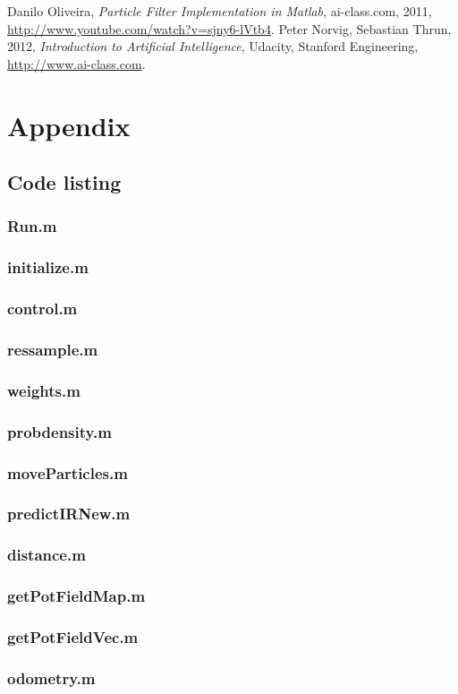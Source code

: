 \documentclass[paper=a4, fontsize=12pt]{scrartcl}	%
\numberwithin{equation}{section}		%
\numberwithin{figure}{section}			%
\numberwithin{table}{section}				%
\begin{document}
\begin{thebibliography}{9}
  Danilo Oliveira,
  \emph{Particle Filter Implementation in Matlab},
  ai-class.com,
  2011,
  \url{http://www.youtube.com/watch?v=sjny6-lVtb4}.
  Peter Norvig, Sebastian Thrun,
  2012,
  \emph{Introduction to Artificial Intelligence},
  Udacity, Stanford Engineering,
  \url{http://www.ai-class.com}.
\end{thebibliography}
\section{Appendix}
\subsection{Code listing}
\subsubsection{Run.m}

\subsubsection{initialize.m}

\subsubsection{control.m}

\subsubsection{ressample.m}

\subsubsection{weights.m}

\subsubsection{probdensity.m}

\subsubsection{moveParticles.m}

\subsubsection{predictIRNew.m}

\subsubsection{distance.m}

\subsubsection{getPotFieldMap.m}

\subsubsection{getPotFieldVec.m}

\subsubsection{odometry.m}




\end{document}
